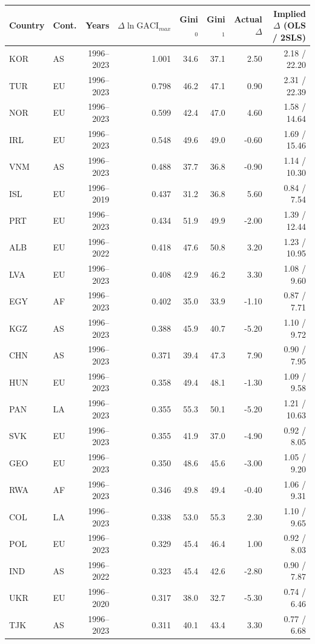 \begin{tabular}{llrrrrrr}
\toprule
Country & Cont. & Years & $\Delta\ln\mathrm{GACI}_{max}$ & Gini$_0$ & Gini$_1$ & Actual $\Delta$ & Implied $\Delta$ (OLS / 2SLS) \\
\midrule
KOR & AS & 1996--2023 & 1.001 & 34.6 & 37.1 & 2.50 & 2.18 / 22.20 \\
TUR & EU & 1996--2023 & 0.798 & 46.2 & 47.1 & 0.90 & 2.31 / 22.39 \\
NOR & EU & 1996--2023 & 0.599 & 42.4 & 47.0 & 4.60 & 1.58 / 14.64 \\
IRL & EU & 1996--2023 & 0.548 & 49.6 & 49.0 & -0.60 & 1.69 / 15.46 \\
VNM & AS & 1996--2023 & 0.488 & 37.7 & 36.8 & -0.90 & 1.14 / 10.30 \\
ISL & EU & 1996--2019 & 0.437 & 31.2 & 36.8 & 5.60 & 0.84 / 7.54 \\
PRT & EU & 1996--2023 & 0.434 & 51.9 & 49.9 & -2.00 & 1.39 / 12.44 \\
ALB & EU & 1996--2022 & 0.418 & 47.6 & 50.8 & 3.20 & 1.23 / 10.95 \\
LVA & EU & 1996--2023 & 0.408 & 42.9 & 46.2 & 3.30 & 1.08 / 9.60 \\
EGY & AF & 1996--2023 & 0.402 & 35.0 & 33.9 & -1.10 & 0.87 / 7.71 \\
KGZ & AS & 1996--2023 & 0.388 & 45.9 & 40.7 & -5.20 & 1.10 / 9.72 \\
CHN & AS & 1996--2023 & 0.371 & 39.4 & 47.3 & 7.90 & 0.90 / 7.95 \\
HUN & EU & 1996--2023 & 0.358 & 49.4 & 48.1 & -1.30 & 1.09 / 9.58 \\
PAN & LA & 1996--2023 & 0.355 & 55.3 & 50.1 & -5.20 & 1.21 / 10.63 \\
SVK & EU & 1996--2023 & 0.355 & 41.9 & 37.0 & -4.90 & 0.92 / 8.05 \\
GEO & EU & 1996--2023 & 0.350 & 48.6 & 45.6 & -3.00 & 1.05 / 9.20 \\
RWA & AF & 1996--2023 & 0.346 & 49.8 & 49.4 & -0.40 & 1.06 / 9.31 \\
COL & LA & 1996--2023 & 0.338 & 53.0 & 55.3 & 2.30 & 1.10 / 9.65 \\
POL & EU & 1996--2023 & 0.329 & 45.4 & 46.4 & 1.00 & 0.92 / 8.03 \\
IND & AS & 1996--2022 & 0.323 & 45.4 & 42.6 & -2.80 & 0.90 / 7.87 \\
UKR & EU & 1996--2020 & 0.317 & 38.0 & 32.7 & -5.30 & 0.74 / 6.46 \\
TJK & AS & 1996--2023 & 0.311 & 40.1 & 43.4 & 3.30 & 0.77 / 6.68 \\

\end{tabular}

